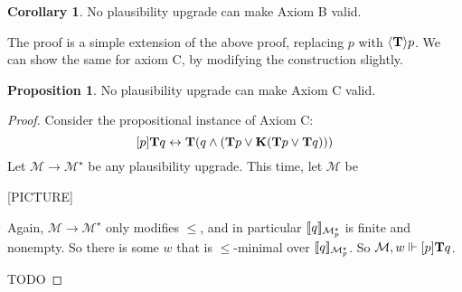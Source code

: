 \documentclass[letterpaper]{article}
\theoremstyle{definition}
\newtheorem{corollary}{Corollary}
\newtheorem{proposition}{Proposition}
\newcommand{\semantics}[1]{[\![\mbox{\em $ #1 $\/}]\!]}
\newcommand{\Model}{\mathcal{M}}
\newcommand{\Typ}[1]{\textrm{\textup{\textbf{T}}} #1}
\newcommand{\Know}[1]{\textrm{\textup{\textbf{K}}} #1}
\newcommand{\Update}[1]{[#1]}
\newcommand{\diaTyp}[1]{\langle \textrm{\textup{\textbf{T}}} \rangle #1}
\begin{document}
\begin{corollary}
    No plausibility upgrade can make Axiom B valid.
\end{corollary}

The proof is a simple extension of the above proof, replacing $p$ with $\diaTyp{p}$.  We can show the same for axiom C, by modifying the construction slightly.

\begin{proposition}
    No plausibility upgrade can make Axiom C valid.
\end{proposition}
\begin{proof}
    Consider the propositional instance of Axiom C:
    \[
        \Update{p} \Typ{q} \leftrightarrow 
        \Typ{(q \land (\Typ{p} \lor \Know{(\Typ{p} \lor \Typ{q})}))}
    \]
    Let $\Model \to \Model^\star$ be any plausibility upgrade.  This time, let $\Model$ be
    
    [PICTURE]

    Again, $\Model \to \Model^\star$ only modifies $\leq$, and in particular $\semantics{q}_{\Model^\star_p}$ is finite and nonempty.  So there is some $w$ that is ${\leq}$-minimal over $\semantics{q}_{\Model^\star_p}$.  So $\Model, w \Vdash \Update{p} \Typ{q}$.  
    
    TODO
\end{proof}

\printbibliography
\end{document}
